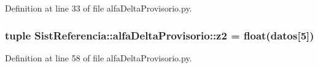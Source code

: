 \-Definition at line 33 of file alfa\-Delta\-Provisorio.\-py.

\subsubsection[{z2}]{\setlength{\rightskip}{0pt plus 5cm}tuple {\bf \-Sist\-Referencia\-::alfa\-Delta\-Provisorio\-::z2} = float({\bf datos}[5])}\label{namespace_sist_referencia_1_1alfa_delta_provisorio_a9ccfdc2094ee8763ebb030c8f424df12}


\-Definition at line 58 of file alfa\-Delta\-Provisorio.\-py.

